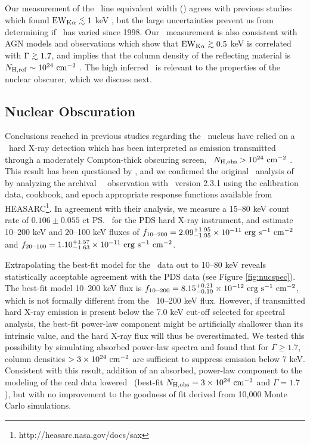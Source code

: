 \documentclass[useAMS,usenatbib]{mn2e}
\begin{document}
Our measurement of the \feka\ line equivalent width (\fekaew) agrees
with previous studies which found $\fekaew \la 1$ keV
\citep{2000A&A...353..910F, 2001MNRAS.321L..15I, 2007A&A...473...85P},
but the large uncertainties prevent us from determining if
\fekaew\ has varied since 1998. Our \fekaew\ measurement is also
consistent with AGN models and observations which show that $\fekaew
\ga 0.5$ keV is correlated with $\Gamma \ga 1.7$, and implies that the
column density of the reflecting material is $N_{\rm{H,ref}} \sim 10^{24}
~\mbox{\ensuremath{\rm{cm^{-2}}}}$ \citep{1996MNRAS.280..823M, 1997ApJ...477..602N,
  1999MNRAS.303L..11Z, 2000PASP..112.1145F, 2005A&A...444..119G}. The
high inferred \nhref\ is relevant to the properties of the nuclear
obscurer, which we discuss next.

\subsection{Nuclear Obscuration}

Conclusions reached in previous studies regarding the \irs\ nucleus
have relied on a \bepposax\ hard X-ray detection which has been
interpreted as emission transmitted through a moderately Compton-thick
obscuring screen, \ie\ $N_{\rm{H,obs}} > 10^{24} ~\mbox{\ensuremath{\rm{cm^{-2}}}}$
\citep{2000A&A...353..910F, 2001MNRAS.321L..15I}. This result has been
questioned by \citet{2007A&A...473...85P}, and we confirmed the
original \bepposax\ analysis of \citet{2000A&A...353..910F} by
analyzing the archival \bepposax\ \irs\ observation with
\saxdas\ version 2.3.1 using the calibration data, cookbook, and epoch
appropriate response functions available from
HEASARC\footnote{http://heasarc.nasa.gov/docs/sax}. In agreement with
their analysis, we measure a 15--80 keV count rate of $0.106 \pm
0.055$ ct \ps\ for the PDS hard X-ray instrument, and estimate 10--200
keV and 20--100 keV fluxes of $f_{10 \mbox{--} 200} = 2.09^{+1.95}_{-1.95}
\times 10^{-11} ~\rm{\mbox{\ensuremath{\rm{erg}}}~\ensuremath{\rm{\mbox{\ensuremath{\rm{s}}}^{-1}}}~\mbox{\ensuremath{\rm{cm^{-2}}}}}$ and $f_{20 \mbox{--} 100} = 1.10^{+1.57}_{-1.63}
\times 10^{-11} ~\rm{\mbox{\ensuremath{\rm{erg}}}~\ensuremath{\rm{\mbox{\ensuremath{\rm{s}}}^{-1}}}~\mbox{\ensuremath{\rm{cm^{-2}}}}}$.

Extrapolating the best-fit model for the \cxo\ data out to 10--80 keV
reveals statistically acceptable agreement with the PDS data (see
Figure \ref{fig:nucspec}). The best-fit model 10--200 keV flux is $f_{10
  \mbox{--} 200} = 8.15^{+0.21}_{-0.19} \times 10^{-12} ~\rm{\mbox{\ensuremath{\rm{erg}}}~\ensuremath{\rm{\mbox{\ensuremath{\rm{s}}}^{-1}}}~\mbox{\ensuremath{\rm{cm^{-2}}}}}$, which is
not formally different from the \bepposax\ 10--200 keV flux. However,
if transmitted hard X-ray emission is present below the 7.0 keV
cut-off selected for spectral analysis, the best-fit power-law
component might be artificially shallower than its intrinsic value, and
the hard X-ray flux will thus be overestimated. We tested this
possibility by simulating absorbed power-law spectra and found that
for $\Gamma \ge 1.7$, column densities $> 3 \times 10^{24} ~\mbox{\ensuremath{\rm{cm^{-2}}}}$
are sufficient to suppress emission below 7 keV. Consistent with this
result, addition of an absorbed, power-law component to the modeling
of the real data lowered \chisq\ (best-fit $N_{\rm{H,obs}} = 3 \times 10^{24}
~\mbox{\ensuremath{\rm{cm^{-2}}}}$ and $\Gamma = 1.7$), but with no improvement to the goodness
of fit derived from 10,000 Monte Carlo simulations.
\end{document}
